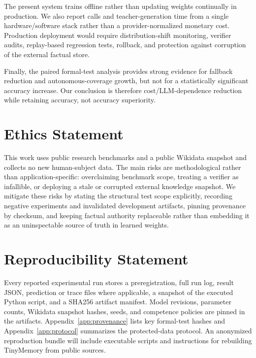 \documentclass[10pt]{article}
\begin{document}
The present system trains offline rather than updating weights continually in production. We also report calls and teacher-generation time from a single hardware/software stack rather than a provider-normalized monetary cost. Production deployment would require distribution-shift monitoring, verifier audits, replay-based regression tests, rollback, and protection against corruption of the external factual store.

Finally, the paired formal-test analysis provides strong evidence for fallback reduction and autonomous-coverage growth, but not for a statistically significant accuracy increase. Our conclusion is therefore cost/LLM-dependence reduction while retaining accuracy, not accuracy superiority.

\section{Ethics Statement}
This work uses public research benchmarks and a public Wikidata snapshot and collects no new human-subject data. The main risks are methodological rather than application-specific: overclaiming benchmark scope, treating a verifier as infallible, or deploying a stale or corrupted external knowledge snapshot. We mitigate these risks by stating the structural test scope explicitly, recording negative experiments and invalidated development artifacts, pinning provenance by checksum, and keeping factual authority replaceable rather than embedding it as an uninspectable source of truth in learned weights.

\section{Reproducibility Statement}
Every reported experimental run stores a preregistration, full run log, result JSON, prediction or trace files where applicable, a snapshot of the executed Python script, and a SHA256 artifact manifest. Model revisions, parameter counts, Wikidata snapshot hashes, seeds, and competence policies are pinned in the artifacts. Appendix~\ref{app:provenance} lists key formal-test hashes and Appendix~\ref{app:protocol} summarizes the protected-data protocol. An anonymized reproduction bundle will include executable scripts and instructions for rebuilding TinyMemory from public sources.
\end{document}
